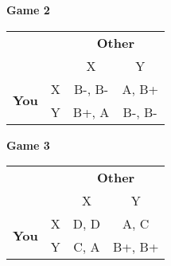 \documentclass[11pt]{article}
\begin{document}
\bigskip
\begin{large}
\textbf{Game 2}
\end{large}

\begin{center}
\begin{tabular}{l r | c c}
 & & \multicolumn{2}{c}{\textbf{Other}} \\
& & X & Y \\ \hline
\multirow{2}{*}{\textbf{You}} & X & B-, B- & A, B+ \\ & Y & B+, A & B-, B- \\
\end{tabular}
\end{center}

\bigskip
\begin{large}
\textbf{Game 3}
\end{large}

\begin{center}
\begin{tabular}{l r | c c}
 & & \multicolumn{2}{c}{\textbf{Other}} \\
& & X & Y \\ \hline
\multirow{2}{*}{\textbf{You}} & X & D, D & A, C \\ & Y & C, A & B+, B+
\end{tabular}
\end{center}
\end{document}
